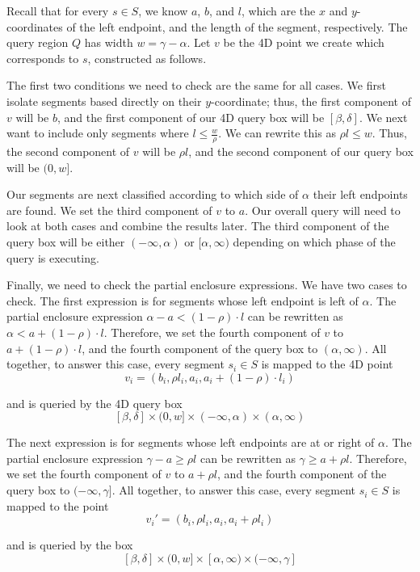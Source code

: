 Recall that for every $s \in S$, we know $a$, $b$, and $l$, which are the $x$ and $y$-coordinates of the left endpoint, and the length of the segment, respectively. 
The query region $Q$ has width $w = \gamma - \alpha$. Let $v$ be the 4D point we create which corresponds to $s$, constructed as follows.

The first two conditions we need to check are the same for all cases. 
We first isolate segments based directly on their $y$-coordinate; thus, the first component of $v$ will be $b$, and the first component of our 4D query box will be $[\beta, \delta]$.
We next want to include only segments where $l \leq \frac{w}{\rho}$. We can rewrite this as $\rho l \leq w$. 
Thus, the second component of $v$ will be $\rho l$, and the second component of our query box will be $(0, w]$.

Our segments are next classified according to which side of $\alpha$ their left endpoints are found.
We set the third component of $v$ to $a$.
Our overall query will need to look at both cases and combine the results later. 
The third component of the query box will be either $(-\infty, \alpha)$ or $[\alpha, \infty)$ depending on which phase of the query is executing.

Finally, we need to check the partial enclosure expressions.
We have two cases to check. The first expression is for segments whose left endpoint is left of $\alpha$.
The partial enclosure expression $\alpha - a < (1 - \rho) \cdot l$ can be rewritten as $\alpha < a + (1-\rho) \cdot l$.
Therefore, we set the fourth component of $v$ to $a + (1 - \rho) \cdot l$, and the fourth component of the query box to $(\alpha, \infty)$.
All together, to answer this case, every segment $s_i \in S$ is mapped to the 4D point 
\[ 
v_i = (b_i, \rho l_i, a_i, a_i + (1-\rho) \cdot l_i)
\]

\noindent and is queried by the 4D query box
\[
[\beta, \delta] \times (0, w] \times (-\infty, \alpha) \times (\alpha, \infty)
\]

The next expression is for segments whose left endpoints are at or right of $\alpha$. 
The partial enclosure expression $\gamma - a \geq \rho l$ can be rewritten as $\gamma \geq a + \rho l$. 
Therefore, we set the fourth component of $v$ to $a + \rho l$, and the fourth component of the query box to $(-\infty, \gamma]$.  
All together, to answer this case, every segment $s_i \in S$ is mapped to the point
\[
v_i' = (b_i, \rho l_i, a_i, a_i + \rho l_i)
\]

\noindent and is queried by the box
\[
[\beta, \delta] \times (0, w] \times [\alpha, \infty) \times (-\infty, \gamma]
\]

